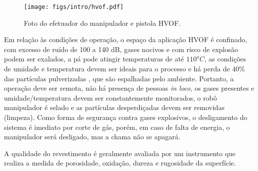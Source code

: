 \begin{figure}[h!]	
	\texttt{[image: figs/intro/hvof.pdf]}
	\caption{Foto do efetuador do manipulador e pistola HVOF.}
	\label{fig::hvof}
\end{figure}

Em relação às condições de operação, o espaço da aplicação HVOF é confinado, com
excesso de ruído de 100 a 140 dB, gases nocivos e com risco de explosão podem
ser exalados, a pá pode atingir temperaturas de até $110^oC$, as condições de
umidade e temperatura devem ser ideais para o processo e há perda de $40\%$
das partículas pulverizadas  \citep{wu2006rebound}, que são espalhadas pelo
ambiente. Portanto, a operação deve ser remota, não há presença de pessoas \textit{in loco}, os gases
presentes e umidade/temperatura devem ser constantemente monitorados, o robô
manipulador é selado e as partículas desperdiçadas devem ser removidas
(limpeza). Como forma de segurança contra gases explosivos, o desligamento do
sistema é imediato por corte de gás, porém, em caso de falta de energia, o
manipulador será desligado, mas a chama não se apagará.

A qualidade do revestimento é geralmente avaliada por um instrumento que
realiza a medida de porosidade, oxidação, dureza e rugosidade da superfície.


